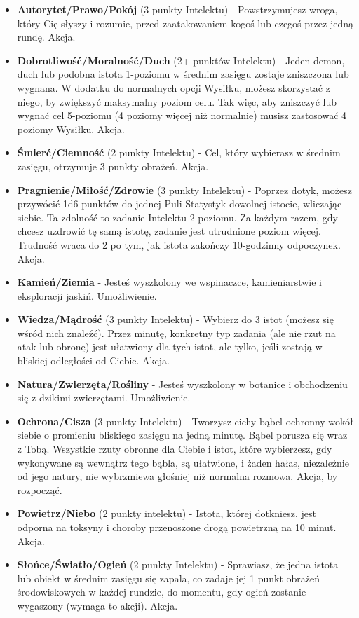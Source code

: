 \begin{itemize}
\item \textbf{Autorytet/Prawo/Pokój} (3 punkty Intelektu) - Powstrzymujesz wroga, który Cię słyszy i rozumie, przed zaatakowaniem kogoś lub czegoś przez jedną rundę. Akcja.
\item \textbf{Dobrotliwość/Moralność/Duch} (2+ punktów Intelektu) - Jeden demon, duch lub podobna istota 1-poziomu w średnim zasięgu zostaje zniszczona lub wygnana. W dodatku do normalnych opcji Wysiłku, możesz skorzystać z niego, by zwiększyć maksymalny poziom celu. Tak więc, aby zniszczyć lub wygnać cel 5-poziomu (4 poziomy więcej niż normalnie) musisz zastosować 4 poziomy Wysiłku. Akcja.
\item \textbf{Śmierć/Ciemność} (2 punkty Intelektu) - Cel, który wybierasz w średnim zasięgu, otrzymuje 3 punkty obrażeń. Akcja.
\item \textbf{Pragnienie/Miłość/Zdrowie} (3 punkty Intelektu) - Poprzez dotyk, możesz przywócić 1d6 punktów do jednej Puli Statystyk dowolnej istocie, wliczając siebie. Ta zdolność to zadanie Intelektu 2 poziomu. Za każdym razem, gdy chcesz uzdrowić tę samą istotę, zadanie jest utrudnione poziom więcej. Trudność wraca do 2 po tym, jak istota zakończy 10-godzinny odpoczynek. Akcja.
\item \textbf{Kamień/Ziemia} - Jesteś wyszkolony we wspinaczce, kamieniarstwie i eksploracji jaskiń. Umożliwienie.
\item \textbf{Wiedza/Mądrość} (3 punkty Intelektu) - Wybierz do 3 istot (możesz się wśród nich znaleźć). Przez minutę, konkretny typ zadania (ale nie rzut na atak lub obronę) jest ułatwiony dla tych istot, ale tylko, jeśli zostają w bliskiej odległości od Ciebie. Akcja.
\item \textbf{Natura/Zwierzęta/Rośliny} - Jesteś wyszkolony w botanice i obchodzeniu się z dzikimi zwierzętami. Umożliwienie.
\item \textbf{Ochrona/Cisza} (3 punkty Intelektu) - Tworzysz cichy bąbel ochronny wokół siebie o promieniu bliskiego zasięgu na jedną minutę. Bąbel porusza się wraz z Tobą. Wszystkie rzuty obronne dla Ciebie i istot, które wybierzesz, gdy wykonywane są wewnątrz tego bąbla, są ułatwione, i żaden hałas, niezależnie od jego natury, nie wybrzmiewa głośniej niż normalna rozmowa. Akcja, by rozpocząć. 
\item \textbf{Powietrz/Niebo} (2 punkty intelektu) - Istota, której dotkniesz, jest odporna na toksyny i choroby przenoszone drogą powietrzną na 10 minut. Akcja.
\item \textbf{Słońce/Światło/Ogień} (2 punkty Intelektu) - Sprawiasz, że jedna istota lub obiekt w średnim zasięgu się zapala, co zadaje jej 1 punkt obrażeń środowiskowych w każdej rundzie, do momentu, gdy ogień zostanie wygaszony (wymaga to akcji). Akcja.

\end{itemize}
